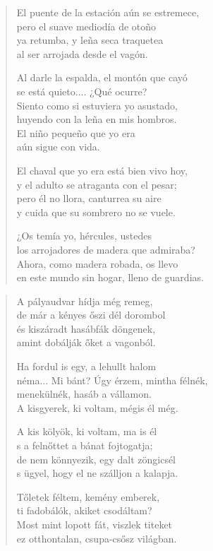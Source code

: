 \documentclass[11pt]{book}
\newcommand*{\centeredornament}{\centerline{\pgfornament[width=6cm]{88}}}
\begin{document}
\begin{verse}
  El puente de la estación aún se estremece, \\
  pero el suave mediodía de otoño \\
  ya retumba, y leña seca traquetea \\
  al ser arrojada desde el vagón.

  Al darle la espalda, el montón que cayó \\
  se está quieto.... ¿Qué ocurre? \\
  Siento como si estuviera yo asustado, \\
  huyendo con la leña en mis hombros. \\
  El niño pequeño que yo era \\
  aún sigue con vida.

  El chaval que yo era está bien vivo hoy, \\
  y el adulto se atraganta con el pesar; \\
  pero él no llora, canturrea su aire \\
  y cuida que su sombrero no se vuele.

  ¿Os temía yo, hércules, ustedes \\
  los arrojadores de madera que admiraba? \\
  Ahora, como madera robada, os llevo \\
  en este mundo sin hogar, lleno de guardias.
\end{verse}

\newpage

\vspace*{-15mm}
\centeredornament



\begin{verse}
  A pályaudvar hídja még remeg, \\
  de már a kényes őszi dél dorombol \\
  és kiszáradt hasábfák döngenek, \\
  amint dobálják őket a vagonból.

  Ha fordul is egy, a lehullt halom \\
  néma... Mi bánt? Úgy érzem, mintha félnék, \\
  menekülnék, hasáb a vállamon. \\
  A kisgyerek, ki voltam, mégis él még.

  A kis kölyök, ki voltam, ma is él \\
  s a felnőttet a bánat fojtogatja; \\
  de nem könnyezik, egy dalt zöngicsél \\
  s ügyel, hogy el ne szálljon a kalapja.

  Tőletek féltem, kemény emberek, \\
  ti fadobálók, akiket csodáltam? \\
  Most mint lopott fát, viszlek titeket \\
  ez otthontalan, csupa-csősz világban.
\end{verse}
\end{document}

